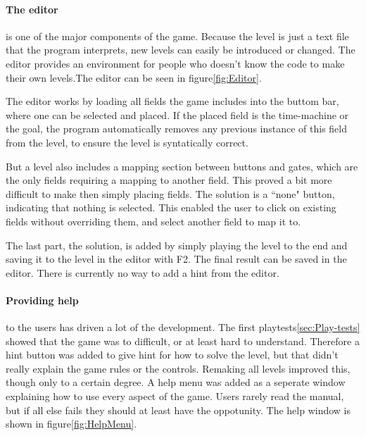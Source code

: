 \paragraph{The editor} is one of the major components of the game.
Because the level is just a text file that the program interprets, new
levels can easily be introduced or changed. The editor provides an
environment for people who doesn't know the code to make their own
levels.The editor can be seen in figure\ref{fig:Editor}.

The editor works by loading all fields the game includes into the buttom
bar, where one can be selected and placed. If the placed field is the
time-machine or the goal, the program automatically removes any
previous instance of this field from the level, to ensure the level is
syntatically correct.

But a level also includes a mapping section between buttons and gates,
which are the only fields requiring a mapping to another field. This proved
a bit more difficult to make then simply placing fields. The solution is a
``none" button, indicating that nothing is selected. This enabled the
user to click on existing fields without overriding them, and select another
field to map it to.

The last part, the solution, is added by simply playing the level to the end
and saving it to the level in the editor with F2. The final result can be saved
in the editor. There is currently no way to add a hint from the editor.

\paragraph{Providing help} to the users has driven a lot of the development.
The first playtests\ref{sec:Play-tests} showed that the game was to difficult,
or at least hard to understand. Therefore a hint button was added to give
hint for how to solve the level, but that didn't really explain the game
rules or the controls. Remaking all levels improved this, though only to a
certain degree. A help menu was added as a seperate window explaining
how to use every aspect of the game. Users rarely read the manual, but if
all else fails they should at least have the oppotunity. The help window is
shown in figure\ref{fig:HelpMenu}.


